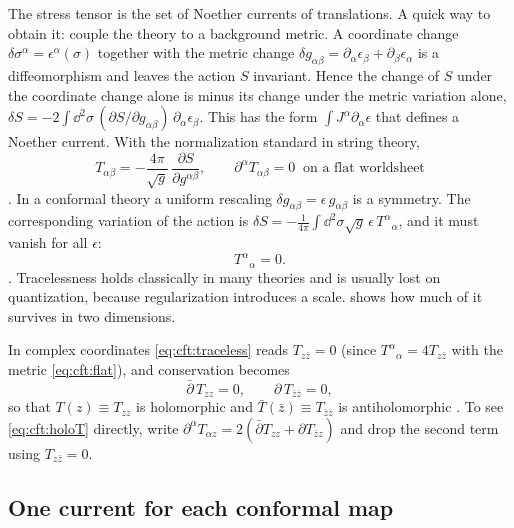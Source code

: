The stress tensor is the set of Noether currents of translations. A quick
way to obtain it: couple the theory to a background metric. A coordinate change
$\delta\sigma^\alpha=\epsilon^\alpha(\sigma)$ together with the metric change
$\delta g_{\alpha\beta}=\partial_\alpha\epsilon_\beta+\partial_\beta\epsilon_\alpha$ is a
diffeomorphism and leaves the action $S$ invariant. Hence the change of $S$ under the coordinate
change alone is minus its change under the metric variation alone,
$\delta S=-2\int\dd^2\sigma\,(\partial S/\partial g_{\alpha\beta})\,\partial_\alpha\epsilon_\beta$.
This has the form $\int J^\alpha\partial_\alpha\epsilon$ that defines a Noether current. With the
normalization standard in string theory,
\begin{equation}\label{eq:cft:Tdef}
  T_{\alpha\beta}=-\frac{4\pi}{\sqrt g}\,\frac{\partial S}{\partial g^{\alpha\beta}},
  \qquad \partial^\alpha T_{\alpha\beta}=0\ \text{ on a flat worldsheet}
\end{equation}
. In a conformal theory a uniform rescaling
$\delta g_{\alpha\beta}=\epsilon\,g_{\alpha\beta}$ is a symmetry. The corresponding variation of
the action is $\delta S=-\frac{1}{4\pi}\int\dd^2\sigma\sqrt g\,\epsilon\,T^\alpha{}_\alpha$, and it
must vanish for all $\epsilon$:
\begin{equation}\label{eq:cft:traceless}
  T^\alpha{}_\alpha=0 .
\end{equation}
. Tracelessness holds classically in many theories and is
usually lost on quantization, because regularization introduces a scale.  shows
how much of it survives in two dimensions.

In complex coordinates \eqref{eq:cft:traceless} reads $T_{z\bar z}=0$ (since
$T^\alpha{}_\alpha=4T_{z\bar z}$ with the metric \eqref{eq:cft:flat}), and conservation becomes
\begin{equation}\label{eq:cft:holoT}
  \bar\partial\,T_{zz}=0,\qquad \partial\,T_{\bar z\bar z}=0 ,
\end{equation}
so that $T(z)\equiv T_{zz}$ is holomorphic and $\bar T(\bar z)\equiv T_{\bar z\bar z}$ is
antiholomorphic . To see \eqref{eq:cft:holoT} directly,
write $\partial^\alpha T_{\alpha z}=2(\bar\partial T_{zz}+\partial T_{\bar zz})$ and drop the
second term using $T_{z\bar z}=0$.

\subsection{One current for each conformal map}


